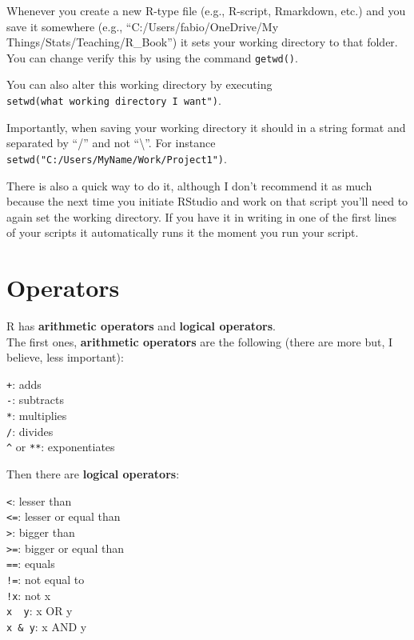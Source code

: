 \documentclass[
]{book}
\begin{document}
Whenever you create a new R-type file (e.g., R-script, Rmarkdown, etc.) and you save it somewhere (e.g., ``C:/Users/fabio/OneDrive/My Things/Stats/Teaching/R\_Book'') it sets your working directory to that folder.
You can change verify this by using the command \texttt{getwd()}.

You can also alter this working directory by executing \texttt{setwd(\textquotesingle{}what\ working\ directory\ I\ want")}.

Importantly, when saving your working directory it should in a string format and separated by ``/'' and not ``\textbackslash{}''.
For instance \texttt{setwd("C:/Users/MyName/Work/Project1")}.

There is also a quick way to do it, although I don't recommend it as much because the next time you initiate RStudio and work on that script you'll need to again set the working directory.
If you have it in writing in one of the first lines of your scripts it automatically runs it the moment you run your script.

\hypertarget{operators}{%
\section{Operators}\label{operators}}

R has \textbf{arithmetic operators} and \textbf{logical operators}.\\

The first ones, \textbf{arithmetic operators} are the following (there are more but, I believe, less important):

\texttt{+}: adds\\
\texttt{-}: subtracts\\
\texttt{*}: multiplies\\
\texttt{/}: divides\\
\texttt{\^{}} or \texttt{**}: exponentiates

Then there are \textbf{logical operators}:

\texttt{\textless{}}: lesser than\\
\texttt{\textless{}=}: lesser or equal than\\
\texttt{\textgreater{}}: bigger than\\
\texttt{\textgreater{}=}: bigger or equal than\\
\texttt{==}: equals\\
\texttt{!=}: not equal to\\
\texttt{!x}: not x\\
\texttt{x\ \textbar{}\ y}: x OR y\\
\texttt{x\ \&\ y}: x AND y
\end{document}
